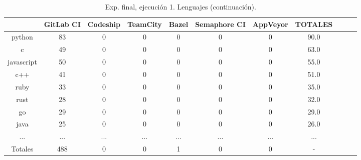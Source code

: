 \begin{table}
  \centering
  \caption{Exp. final, ejecución 1. Lenguajes (continuación).}
  \label{tab:tabla_f1_6b}

\begin{footnotesize}
\renewcommand{\arraystretch}{1.5} %
\begin{tabular}{ccccccccccc}
  \hline
  {} &  GitLab CI &  Codeship &  TeamCity &  Bazel &  Semaphore CI &  AppVeyor &  TOTALES \\
  \hline
  python           &        83 &         0 &         0 &      0 &             0 &         0 &     90.0 \\
  c                &        49 &         0 &         0 &      0 &             0 &         0 &     63.0 \\
  javascript       &        50 &         0 &         0 &      0 &             0 &         0 &     55.0 \\
  c++              &        41 &         0 &         0 &      0 &             0 &         0 &     51.0 \\
  ruby             &        33 &         0 &         0 &      0 &             0 &         0 &     35.0 \\
  rust             &        28 &         0 &         0 &      0 &             0 &         0 &     32.0 \\
  go               &        29 &         0 &         0 &      0 &             0 &         0 &     29.0 \\
  java             &        25 &         0 &         0 &      0 &             0 &         0 &     26.0 \\
  ...              &       ... &       ... &       ... &    ... &           ... &       ... &      ... \\
  \hline
  Totales          &       488 &         0 &         0 &      1 &             0 &         0 &        - \\
 \end{tabular}
\end{footnotesize}

\end{table}

